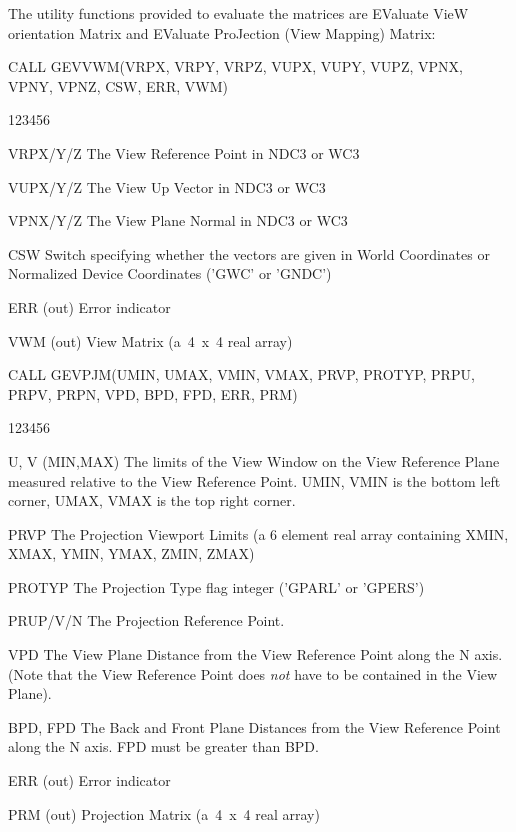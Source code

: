 The utility functions provided to evaluate the matrices are EValuate
VieW orientation Matrix and EValuate ProJection (View Mapping) Matrix:
\begin{XMP}
CALL GEVVWM(VRPX, VRPY, VRPZ, VUPX, VUPY, VUPZ,
                    VPNX, VPNY, VPNZ, CSW, ERR, VWM)
\end{XMP}
\begin{DLtt}{123456}
\item[VRPX/Y/Z]The View Reference Point in NDC3 or WC3
\item[VUPX/Y/Z]The View Up Vector in NDC3 or WC3
\item[VPNX/Y/Z]The View Plane Normal in NDC3 or WC3
\item[CSW]Switch specifying whether the vectors are given in
World Coordinates or Normalized Device Coordinates ('GWC' or 'GNDC')
\item[ERR](out) Error indicator
\item[VWM](out) View Matrix (a~4~x~4 real array)
\end{DLtt}
\begin{XMP}
CALL GEVPJM(UMIN, UMAX, VMIN, VMAX, PRVP, PROTYP,
                    PRPU, PRPV, PRPN, VPD, BPD, FPD, ERR, PRM)
\end{XMP}
\begin{DLtt}{123456}
\item[U, V](MIN,MAX) The limits of the View Window on the
View Reference Plane measured relative to the View Reference Point.
UMIN, VMIN is the bottom left corner, UMAX, VMAX is the top right corner.
\item[PRVP]The Projection Viewport Limits (a 6 element real array
containing XMIN, XMAX, YMIN, YMAX, ZMIN, ZMAX)
\item[PROTYP]The Projection Type flag integer ('GPARL' or 'GPERS')
\item[PRUP/V/N]The Projection Reference Point.
\item[VPD]The View Plane Distance from the View Reference Point
along the N axis.
(Note that the View Reference Point does {\it not} have to be
contained in the View Plane).
\item[BPD, FPD]The Back and Front Plane Distances from the
View Reference Point along the N axis. FPD must be greater than BPD.
\item[ERR](out) Error indicator
\item[PRM](out) Projection Matrix (a~4~x~4 real array)
\end{DLtt}
